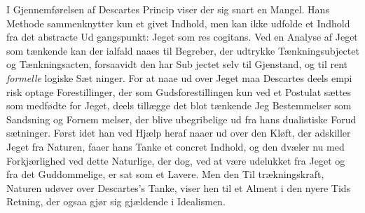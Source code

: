 \documentclass[12pt,a4paper]{book}
\begin{document}
I Gjennemførelsen af Descartes Princip viser der sig snart
en Mangel. Hans Methode sammenknytter kun et givet
Indhold, men kan ikke udfolde et Indhold fra det abstracte Ud\-%
gangspunkt: Jeget som res cogitans. Ved en Analyse af Jeget
som tænkende kan der ialfald naaes til Begreber, der udtrykke
Tænkningsubjectet og Tænkningsacten, forsaavidt den har Sub\-%
jectet selv til Gjenstand, og til rent \emph{formelle} logiske Sæt\-%
ninger. For at naae ud over Jeget maa Descartes deels empi\-%
risk optage Forestillinger, der som Gudsforestillingen kun ved
et Postulat sættes som medfødte for Jeget, deels tillægge det
blot tænkende Jeg Bestemmelser som Sandsning og Fornem\-%
melser, der blive ubegribelige ud fra hans dualistiske Forud\-%
sætninger. Først idet han ved Hjælp heraf naaer ud over den
Kløft, der adskiller Jeget fra Naturen, faaer hans Tanke et
concret Indhold, og den dvæler nu med Forkjærlighed ved
dette Naturlige, der dog, ved at være udelukket fra Jeget og
fra det Guddommelige, er sat som et Lavere. Men den Til\-%
trækningskraft, Naturen udøver over Descartes's Tanke, viser
hen til et Alment i den nyere Tids Retning, der ogsaa gjør
sig gjældende i Idealismen.
\end{document}
